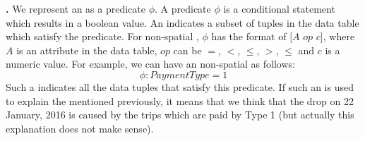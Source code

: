 



{\bf {\Explanation}.} We represent an {\explanation} as a predicate $\phi$. 
A predicate $\phi$ is a conditional statement which results in a boolean value. An {\explanation} indicates a subset of tuples in the data table which satisfy the predicate. For non-spatial {\explanation}, $\phi$ has the format of $[A$ $op$ $c]$, where $A$ is an attribute in the data table, $op$ can be $=$, $<$, $\leq$, $>$, $\leq$ and $c$ is a numeric value. For example, we can have an non-spatial {\explanation} as follows:
$$\phi: PaymentType = 1$$
Such a {\explanation} indicates all the data tuples that satisfy this predicate. If such an {\explanation} is used to explain the {\fact} mentioned previously, it means that we think that the drop on 22 January, 2016 is caused by the trips which are paid by Type 1 (but actually this explanation does not make sense).

%
%

